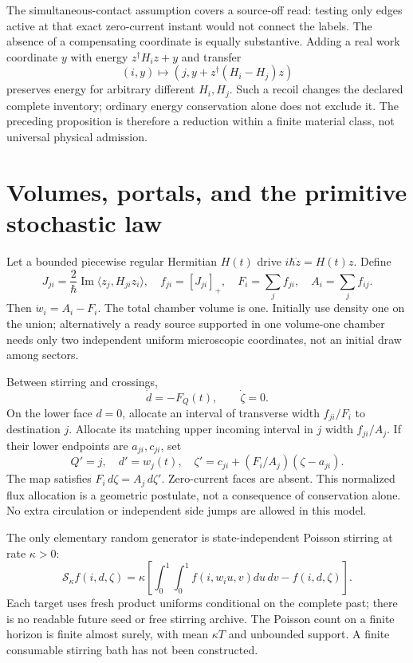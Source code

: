 \documentclass[11pt,oneside,openany]{book}
\theoremstyle{definition}
\theoremstyle{remark}\newtheorem{remark}[theorem]{Remark}
\begin{document}
The simultaneous-contact assumption covers a source-off read: testing only edges active at that exact zero-current instant would not connect the labels. The absence of a compensating coordinate is equally substantive. Adding a real work coordinate $y$ with energy $z^\dagger H_i z+y$ and transfer
\[
 (i,y)\mapsto(j,y+z^\dagger(H_i-H_j)z)
\]
preserves energy for arbitrary different $H_i,H_j$. Such a recoil changes the declared complete inventory; ordinary energy conservation alone does not exclude it. The preceding proposition is therefore a reduction within a finite material class, not universal physical admission.

\section{Volumes, portals, and the primitive stochastic law}

Let a bounded piecewise regular Hermitian $H(t)$ drive
$i\hbar\dot z=H(t)z$. Define
\[
 J_{ji}=\frac2\hbar\operatorname{Im}\langle z_j,H_{ji}z_i\rangle,
 \quad f_{ji}=[J_{ji}]_+,\quad 
 F_i=\sum_jf_{ji},\quad A_i=\sum_jf_{ij}.
\]
Then $\dot w_i=A_i-F_i$. The total chamber volume is one. Initially use density one on the union; alternatively a ready source supported in one volume-one chamber needs only two independent uniform microscopic coordinates, not an initial draw among sectors.

Between stirring and crossings,
\begin{equation}
 \dot d=-F_Q(t),\qquad\dot\zeta=0.
 \label{chamber:drift}
\end{equation}
On the lower face $d=0$, allocate an interval of transverse width $f_{ji}/F_i$ to destination $j$. Allocate its matching upper incoming interval in $j$ width $f_{ji}/A_j$. If their lower endpoints are $a_{ji},c_{ji}$, set
\begin{equation}
 Q'=j,\quad d'=w_j(t),\quad
 \zeta'=c_{ji}+(F_i/A_j)(\zeta-a_{ji}).
 \label{chamber:portal}
\end{equation}
The map satisfies $F_i\,d\zeta=A_j\,d\zeta'$. Zero-current faces are absent. This normalized flux allocation is a geometric postulate, not a consequence of conservation alone. No extra circulation or independent side jumps are allowed in this model.

The only elementary random generator is state-independent Poisson stirring at rate $\kappa>0$:
\begin{equation}
 \mathcal S_\kappa f(i,d,\zeta)=\kappa\left[
 \int_0^1\!\int_0^1f(i,w_i u,v)du\,dv-f(i,d,\zeta)\right].
 \label{chamber:stirring}
\end{equation}
Each target uses fresh product uniforms conditional on the complete past; there is no readable future seed or free stirring archive. The Poisson count on a finite horizon is finite almost surely, with mean $\kappa T$ and unbounded support. A finite consumable stirring bath has not been constructed.
\end{document}
